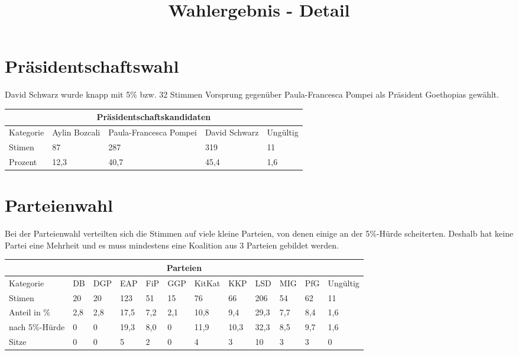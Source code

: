 \documentclass{sasbase}
\begin{document}
\onecolumn
\title{Wahlergebnis - Detail}

\mytitle

\setlength{\parindent}{0mm}
\setlength{\parskip}{2mm}

\section{Präsidentschaftswahl}

David Schwarz wurde knapp mit 5\% bzw. 32 Stimmen Vorsprung gegenüber Paula-Francesca Pompei als Präsident Goethopias gewählt.

\begin{tabular}{ |p{3cm}||p{3cm}|p{3cm}|p{3cm}|p{3cm}|  }
 \hline
 \multicolumn{5}{|c|}{Präsidentschaftskandidaten} \\
 \hline
 Kategorie & Aylin Bozcali  & Paula-Francesca Pompei & David Schwarz & Ungültig\\
 \hline
 Stimen   & 87    & 287 &   319 & 11 \\
 Prozent &  12,3  & 40,7   & 45,4 & 1,6 \\
 \hline
\end{tabular}



\section{Parteienwahl}

Bei der Parteienwahl verteilten sich die Stimmen auf viele kleine Parteien, von denen
einige an der 5\%-Hürde scheiterten. Deshalb hat keine Partei eine Mehrheit und es muss
mindestens eine Koalition aus 3 Parteien gebildet werden.
\begin{tabular}{ |p{3cm}||p{1cm}|p{1cm}|p{1cm}|p{1cm}|p{1cm}|p{1cm}|p{1cm}|p{1cm}|p{1cm}|p{1cm}|p{1.2cm}|  }
 \hline
 \multicolumn{12}{|c|}{Parteien} \\
 \hline
 Kategorie & DB & DGP & EAP & FiP & GGP & KitKat & KKP & LSD & MIG & PfG & Ungültig\\
 \hline
 Stimen   & 20 & 20  & 123 & 51 & 15 & 76 & 66 & 206 & 54 & 62 & 11 \\
 Anteil in \%  & 2,8 & 2,8  & 17,5 & 7,2 & 2,1 & 10,8 & 9,4 & 29,3 & 7,7 & 8,4 & 1,6 \\
nach 5\%-Hürde  & 0 & 0 & 19,3  & 8,0 & 0 & 11,9 & 10,3 & 32,3 & 8,5 & 9,7 & 1,6 \\
 \hline
  \hline
 Sitze & 0 & 0 & 5 & 2 & 0 & 4 & 3 & 10 & 3 & 3 & 0\\
 \hline
\end{tabular}
\end{document}
